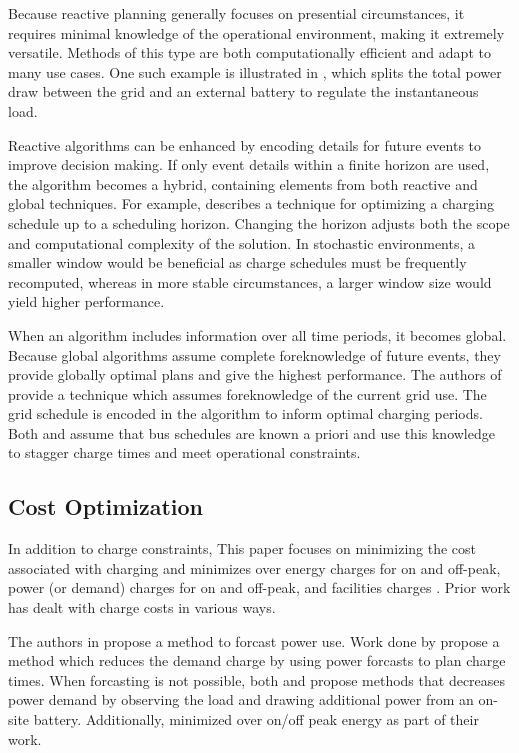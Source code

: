 \par Because reactive planning generally focuses on presential circumstances, it requires minimal knowledge of the operational environment, making it extremely versatile.  Methods of this type are both computationally efficient and adapt to many use cases.  One such example is illustrated in \cite{cheng_smart_2020}, which splits the total power draw between the grid and an external battery to regulate the instantaneous load. 
\par Reactive algorithms can be enhanced by encoding details for future events to improve decision making. If only event details within a finite horizon are used, the algorithm becomes a hybrid, containing elements from both reactive and global techniques. For example, \cite{bagherinezhad_spatio-temporal_2020} describes a technique for optimizing a charging schedule up to a scheduling horizon. Changing the horizon adjusts both the scope and computational complexity of the solution. In stochastic environments, a smaller window would be beneficial as charge schedules must be frequently recomputed, whereas in more stable circumstances, a larger window size would yield higher performance. 
\par When an algorithm includes information over all time periods, it becomes global. Because global algorithms assume complete foreknowledge of future events, they provide globally optimal plans and give the highest performance. The authors of \cite{jahic_preemptive_2019} provide a technique which assumes foreknowledge of the current grid use. The grid schedule is encoded in the algorithm to inform optimal charging periods. Both \cite{whitaker_network_2021} and \cite{el-taweel_incorporation_2019} assume that bus schedules are known a priori and use this knowledge to stagger charge times and meet operational constraints. 
\subsection{Cost Optimization}
In addition to charge constraints, This paper focuses on minimizing the cost associated with charging and minimizes over energy charges for on and off-peak, power (or demand) charges for on and off-peak, and facilities charges \cite{noauthor_rocky_nodate}. Prior work has dealt with charge costs in various ways.  
\par The authors in \cite{gao_charging_2019} propose a method to forcast power use. Work done by \cite{qin_numerical_2016} propose a method which reduces the demand charge by using power forcasts \cite{gao_charging_2019} to plan charge times.  When forcasting is not possible, both \cite{ojer_development_2020} and \cite{cheng_smart_2020} propose methods that decreases power demand by observing the load and drawing additional power from an on-site battery. Additionally, \cite{el-taweel_incorporation_2019} minimized over on/off peak energy as part of their work.
